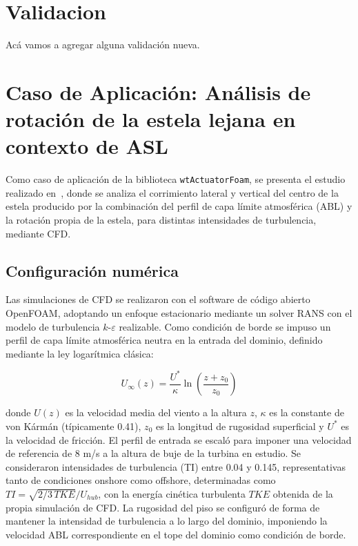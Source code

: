 \section{Validacion}
Acá vamos a agregar alguna validación nueva.

\section{Caso de Aplicación: Análisis de rotación de la estela lejana en contexto de ASL}

Como caso de aplicación de la biblioteca \texttt{wtActuatorFoam}, se presenta el estudio realizado en~\cite{martinezTrespalacios2025}, donde se analiza el corrimiento lateral y vertical del centro de la estela producido por la combinación del perfil de capa límite atmosférica (ABL) y la rotación propia de la estela, para distintas intensidades de turbulencia, mediante CFD.

\subsection{Configuración numérica}

Las simulaciones de CFD se realizaron con el software de código abierto OpenFOAM, adoptando un enfoque estacionario mediante un solver RANS con el modelo de turbulencia $k$-$\varepsilon$ realizable. Como condición de borde se impuso un perfil de capa límite atmosférica neutra en la entrada del dominio, definido mediante la ley logarítmica clásica:

\begin{equation}
U_\infty(z) = \frac{U^*}{\kappa}\ln\left(\frac{z+z_0}{z_0}\right)
\label{eq:abl_log}
\end{equation}

donde $U(z)$ es la velocidad media del viento a la altura $z$, $\kappa$ es la constante de von Kármán (típicamente 0.41), $z_0$ es la longitud de rugosidad superficial y $U^*$ es la velocidad de fricción. El perfil de entrada se escaló para imponer una velocidad de referencia de 8 m/s a la altura de buje de la turbina en estudio. Se consideraron intensidades de turbulencia (TI) entre 0.04 y 0.145, representativas tanto de condiciones onshore como offshore, determinadas como $TI = \sqrt{2/3 \, TKE}/U_{hub}$, con la energía cinética turbulenta $TKE$ obtenida de la propia simulación de CFD. La rugosidad del piso se configuró de forma de mantener la intensidad de turbulencia a lo largo del dominio, imponiendo la velocidad ABL correspondiente en el tope del dominio como condición de borde.

